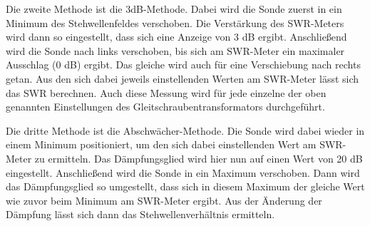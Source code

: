 Die zweite Methode ist die 3dB-Methode. Dabei wird die Sonde zuerst in ein Minimum
des Stehwellenfeldes verschoben. Die Verstärkung des SWR-Meters wird dann so eingestellt,
dass sich eine Anzeige von 3 dB ergibt. Anschließend wird die Sonde nach links verschoben,
bis sich am SWR-Meter ein maximaler Ausschlag (0 dB) ergibt. Das gleiche wird auch für
eine Verschiebung nach rechts getan. Aus den sich dabei jeweils einstellenden Werten am SWR-Meter
lässt sich das SWR berechnen. Auch diese Messung wird für jede einzelne der oben genannten Einstellungen
des Gleitschraubentransformators durchgeführt.

Die dritte Methode ist die Abschwächer-Methode. Die Sonde wird dabei wieder in einem
Minimum positioniert, um den sich dabei einstellenden Wert am SWR-Meter zu ermitteln.
Das Dämpfungsglied wird hier nun auf einen Wert von 20 dB eingestellt.
Anschließend wird die Sonde in ein Maximum verschoben. Dann wird das Dämpfungsglied
so umgestellt, dass sich in diesem Maximum der gleiche Wert wie zuvor beim Minimum
am SWR-Meter ergibt. Aus der Änderung der Dämpfung lässt sich dann das Stehwellenverhältnis
ermitteln.
